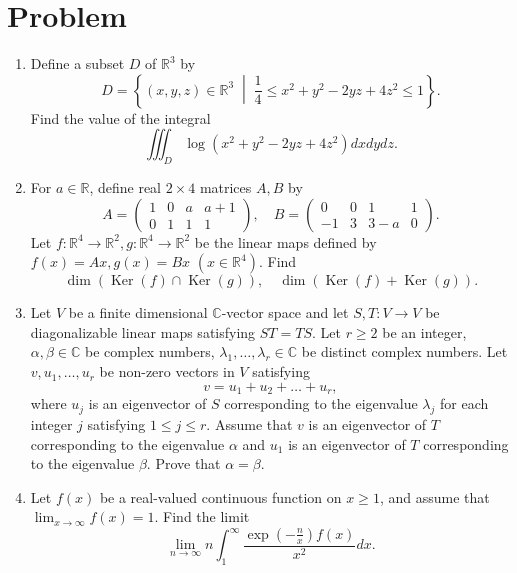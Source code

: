 \documentclass[10pt,a4paper]{article}
\begin{document}
\section*{Problem}
\begin{enumerate}[label=\fbox{\arabic*}]
  \item %
        Define a subset $D$ of $\mathbb{R}^3$ by
        \[
          D = \left\{ (x, y, z) \in \mathbb{R}^3 \;\middle|\; \frac{1}{4} \le x^2 + y^2 - 2yz + 4z^2 \le 1 \right\}.
        \]
        Find the value of the integral
        \[
          \iiint_D \log(x^2 + y^2 - 2yz + 4z^2) dx dy dz.
        \]

  \item %
        For $a \in \mathbb{R}$, define real $2 \times 4$ matrices $A, B$ by
        \[
          A = \begin{pmatrix} 1 & 0 & a & a+1 \\ 0 & 1 & 1 & 1 \end{pmatrix}, \quad B = \begin{pmatrix} 0 & 0 & 1 & 1 \\ -1 & 3 & 3-a & 0 \end{pmatrix}.
        \]
        Let $f: \mathbb{R}^4 \to \mathbb{R}^2, g: \mathbb{R}^4 \to \mathbb{R}^2$ be the linear maps defined by $f(x) = Ax, g(x) = Bx$ $(x \in \mathbb{R}^4)$. Find
        \[
          \dim(\operatorname{Ker}(f) \cap \operatorname{Ker}(g)), \quad \dim(\operatorname{Ker}(f) + \operatorname{Ker}(g)).
        \]

  \item %
        Let $V$ be a finite dimensional $\mathbb{C}$-vector space and let $S, T : V \to V$ be diagonalizable linear maps satisfying $ST = TS$. Let $r \ge 2$ be an integer, $\alpha, \beta \in \mathbb{C}$ be complex numbers, $\lambda_1, \dots, \lambda_r \in \mathbb{C}$ be distinct complex numbers. Let $v, u_1, \dots, u_r$ be non-zero vectors in $V$ satisfying
        \[
          v = u_1 + u_2 + \dots + u_r,
        \]
        where $u_j$ is an eigenvector of $S$ corresponding to the eigenvalue $\lambda_j$ for each integer $j$ satisfying $1 \le j \le r$. Assume that $v$ is an eigenvector of $T$ corresponding to the eigenvalue $\alpha$ and $u_1$ is an eigenvector of $T$ corresponding to the eigenvalue $\beta$. Prove that $\alpha = \beta$.

  \item %
        Let $f(x)$ be a real-valued continuous function on $x \ge 1$, and assume that $\lim_{x \to \infty} f(x) = 1$. Find the limit
        \[
          \lim_{n \to \infty} n \int_1^\infty \frac{\exp(-\frac{n}{x}) f(x)}{x^2} dx.
        \]


\end{enumerate}
\end{document}

